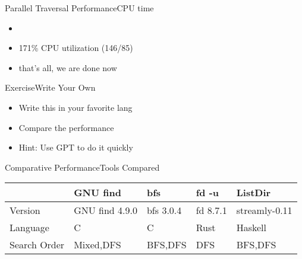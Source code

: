 \documentclass[17pt]{beamer}
\begin{document}
\begin{frame}[fragile]{Parallel Traversal Performance}{CPU time}

\begin{itemize}
\item
{}

\item 171\% CPU utilization (146/85)
\item that's all, we are done now
\end{itemize}
\end{frame}

\begin{frame}{Exercise}{Write Your Own}
\begin{itemize}
  \item Write this in your favorite lang
  \item Compare the performance
  \item Hint: Use GPT to do it quickly
\end{itemize}
\end{frame}

\begin{frame}{Comparative Performance}{Tools Compared}
\tiny


\begin{tabular}{|l|l|l|l|l|}
\hline
  & GNU find & bfs & fd -u & ListDir \\
\hline
  Version & GNU find 4.9.0 & bfs 3.0.4 & fd 8.7.1 & streamly-0.11 \\
\hline
  Language & C & C & Rust & Haskell \\
\hline
  Search Order & Mixed,DFS & BFS,DFS & DFS & BFS,DFS \\
\hline
\end{tabular}
\end{frame}
\end{document}
